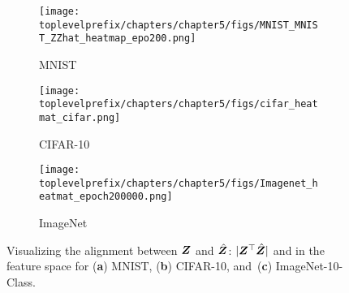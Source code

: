 \documentclass[\toplevelprefix/book-main.tex]{subfiles}
\begin{document}
\begin{figure}[t]
    \begin{subfigure}[t]{0.3\textwidth}
        \centering
        \texttt{[image: \\toplevelprefix/chapters/chapter5/figs/MNIST\_MNIST\_ZZhat\_heatmap\_epo200.png]}
        \caption{MNIST}
    \end{subfigure}
    \hfill
    \begin{subfigure}[t]{0.3\textwidth}
        \centering
        \texttt{[image: \\toplevelprefix/chapters/chapter5/figs/cifar\_heatmat\_cifar.png]}
        \caption{CIFAR-10}
    \end{subfigure}
    \hfill
    \begin{subfigure}[t]{0.3\textwidth}
        \centering
        \texttt{[image: \\toplevelprefix/chapters/chapter5/figs/Imagenet\_heatmat\_epoch200000.png]}
        \caption{ImageNet}
    \end{subfigure}
    \caption{{Visualizing} %
    the alignment between $\bm{Z}$ and $\hat{\bm{Z}}$: $|\bm{Z}^\top \hat{\bm{Z}}|$ and  in the feature space for (\textbf{a}) MNIST, (\textbf{b}) CIFAR-10, and~(\textbf{c}) ImageNet-10-Class.}
    \label{fig:justifyz=z}
\end{figure}
 


\end{document}
